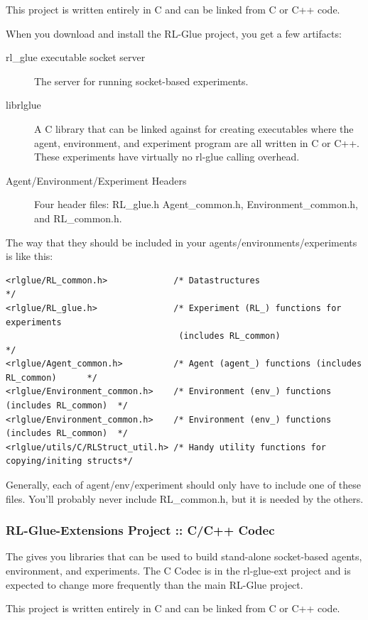 \documentclass[11pt]{article}
\begin{document}
This project is written entirely in C and can be linked from C or C++ code.

When you download and install the RL-Glue project, you get a few artifacts:
\begin{description}
	\item [rl\_glue executable socket server] The server for running socket-based experiments.
	\item [librlglue] A C library that can be linked against for creating executables where the agent, environment, and experiment program are all written in C or C++. These experiments have virtually no rl-glue calling overhead.
	\item [Agent/Environment/Experiment Headers]  Four header files: RL\_glue.h Agent\_common.h, Environment\_common.h, and RL\_common.h. 
\end{description}
 
The way that they should be included in your agents/environments/experiments is like this:
\begin{verbatim}
<rlglue/RL_common.h>             /* Datastructures                                     */
<rlglue/RL_glue.h>               /* Experiment (RL_) functions for experiments 
                                  (includes RL_common)                                 */
<rlglue/Agent_common.h>          /* Agent (agent_) functions (includes RL_common)      */
<rlglue/Environment_common.h>    /* Environment (env_) functions (includes RL_common)  */
<rlglue/Environment_common.h>    /* Environment (env_) functions (includes RL_common)  */
<rlglue/utils/C/RLStruct_util.h> /* Handy utility functions for copying/initing structs*/
\end{verbatim} 

Generally, each of agent/env/experiment should only have to include one of these files.  You'll probably never include RL\_common.h, but it is needed by the others.

\subsubsection{RL-Glue-Extensions Project :: C/C++ Codec}
The  gives you libraries that can be used to build stand-alone socket-based agents, environment, and experiments.  The C Codec is in the rl-glue-ext project and is expected to change more frequently than the main RL-Glue project.

This project is written entirely in C and can be linked from C or C++ code.
\end{document}
